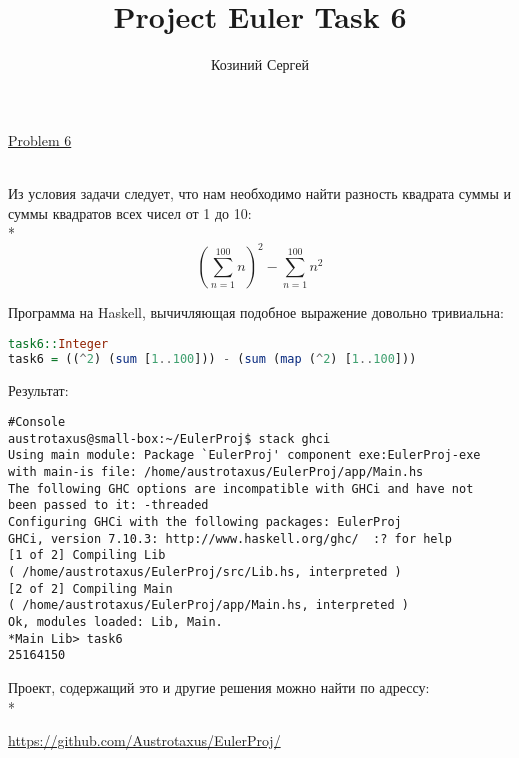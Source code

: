 \documentclass[11pt,a4paper]{article}
\title{Project Euler Task 6}
\author{Козиний Сергей}
\begin{document}
    
\maketitle
\href{''https://projecteuler.net/problem=6''}{Problem 6}

\\

Из условия задачи следует, что нам необходимо найти разность квадрата суммы и суммы квадратов всех чисел от 1 до 10:\\*
$$(\sum_{n=1}^{100} n)^2 - \sum_{n=1}^{100} n^{2} $$

Программа на Haskell, вычичляющая подобное выражение довольно тривиальна:

\begin{lstlisting}[language=Haskell, frame=single]
task6::Integer
task6 = ((^2) (sum [1..100])) - (sum (map (^2) [1..100]))
\end{lstlisting}

Результат:
\begin{lstlisting}[frame=single]
#Console
austrotaxus@small-box:~/EulerProj$ stack ghci
Using main module: Package `EulerProj' component exe:EulerProj-exe
with main-is file: /home/austrotaxus/EulerProj/app/Main.hs
The following GHC options are incompatible with GHCi and have not
been passed to it: -threaded
Configuring GHCi with the following packages: EulerProj
GHCi, version 7.10.3: http://www.haskell.org/ghc/  :? for help
[1 of 2] Compiling Lib
( /home/austrotaxus/EulerProj/src/Lib.hs, interpreted )
[2 of 2] Compiling Main
( /home/austrotaxus/EulerProj/app/Main.hs, interpreted )
Ok, modules loaded: Lib, Main. 
*Main Lib> task6
25164150
\end{lstlisting}

Проект, содержащий это и другие решения можно найти по адрессу:\\*

\url{https://github.com/Austrotaxus/EulerProj/}
\end{document}
